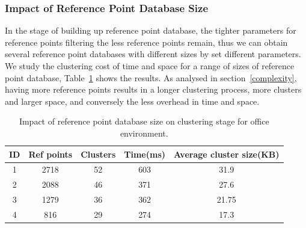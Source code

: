 \subsubsection{Impact of Reference Point Database Size}
In the stage of building up reference point database, the tighter parameters for reference points filtering the less reference points remain, thus we can obtain several reference point databases with different sizes by set different parameters. We study the clustering cost of time and space for a range of sizes of reference point database, Table~\ref{tab_office_cluster} shows the results. As analysed in section~\ref{complexity}, having more reference points results in a longer clustering process, more clusters and larger space, and conversely the less overhead in time and space.
\begin{table}[!htbp]
\centering
\begin{tabular}{ccccc}
\hline
ID &Ref points &Clusters &Time(ms) & \begin{minipage}{2cm}Average cluster size(KB) \end{minipage}\\
\hline
1 &2718 &52 &603 &31.9\\
2 &2088 &46 &371 &27.6\\
3 &1279 &36 &362 &21.75\\
4 &816 &29 &274 &17.3\\
\hline
\end{tabular}
\caption{\label{tab_office_cluster}Impact of reference point database size on clustering stage for office environment.}
\end{table}
